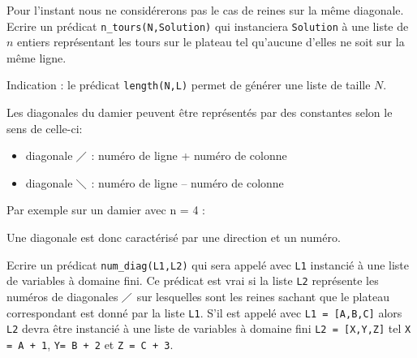 \documentclass[a4paper]{article}
\newenvironment{CAnswer}{\color{red}\begin{Answer}}
                        {\end{Answer}}
\begin{document}
\begin{Exercise}[title={Problème des n tours}]
Pour l'instant nous ne considérerons pas le cas de reines sur la même 
diagonale. Ecrire un prédicat \verb$n_tours(N,Solution)$ qui instanciera
\verb$Solution$ à une liste de $n$ entiers représentant les tours sur le
plateau tel qu'aucune d'elles ne soit sur la même ligne.

Indication : le prédicat \verb$length(N,L)$ permet de générer une liste de
taille $N$.
\end{Exercise}
\begin{CAnswer}

\end{CAnswer}

\begin{Exercise}[title={Numérotation des diagonales}]
Les diagonales du damier peuvent être représentés par des constantes selon le
sens de celle-ci:
\begin{itemize}
 \item diagonale $\diagup$ : numéro de ligne + numéro de colonne
 \item diagonale $\diagdown$ : numéro de ligne – numéro de colonne
\end{itemize}
Par exemple sur un damier avec n = 4 :
\begin{center}
\end{center}
Une diagonale est donc caractérisé par une direction et un numéro.

\Question
Ecrire un prédicat \verb$num_diag(L1,L2)$ qui sera appelé avec \verb$L1$
instancié à une liste de variables à domaine fini. Ce prédicat est vrai si la
liste \verb$L2$ représente les numéros de diagonales $\diagup$ sur lesquelles
sont les reines sachant que le plateau correspondant est donné par la liste 
\verb$L1$.
S'il est appelé avec \verb$L1 = [A,B,C]$ alors \verb$L2$ devra être instancié
à une liste de variables à domaine fini \verb$L2 = [X,Y,Z]$ tel 
\verb$X = A + 1$, \verb$Y= B + 2$ et \verb$Z = C + 3$.


\end{Exercise}
\end{document}
